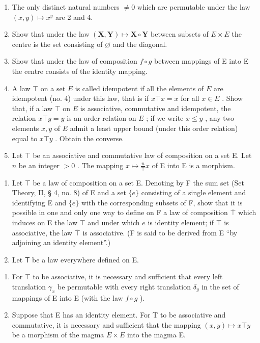 \begin{enumerate}
\item
  The only distinct natural numbers \(\neq 0\) which are permutable under the law \((x,y)\mapsto x^{y}\) are 2 and 4.
\item
  Show that under the law \((\mathbf{X}, \mathbf{Y}) \mapsto \mathbf{X} \circ \mathbf{Y}\) between subsets of \(E \times E\) the centre is the set consisting of \(\varnothing\) and the diagonal.
\item
  Show that under the law of composition \(f \circ g\) between mappings of E into E the centre consists of the identity mapping.
\item
  A law \(\top\) on a set \(E\) is called idempotent if all the elements of \(E\) are idempotent (no. 4) under this law, that is if \(x \top x = x\) for all \(x \in E\) . Show that, if a law \(\top\) on \(E\) is associative, commutative and idempotent, the relation \(x \top y = y\) is an order relation on \(E\) ; if we write \(x \leqslant y\) , any two elements \(x, y\) of \(E\) admit a least upper bound (under this order relation) equal to \(x \top y\) . Obtain the converse.
\item
  Let \(\top\) be an associative and commutative law of composition on a set E. Let \(n\) be an integer \(>0\) . The mapping \(x \mapsto \frac{n}{\top} x\) of E into E is a morphism.
\end{enumerate}

\BourbakiExercisesSection

\begin{enumerate}
\def\labelenumi{\arabic{enumi}.}
\item
  Let \(\top\) be a law of composition on a set E. Denoting by F the sum set (Set Theory, II, § 4, no. 8) of E and a set \(\{e\}\) consisting of a single element and identifying E and \(\{e\}\) with the corresponding subsets of F, show that it is possible in one and only one way to define on F a law of composition \(\overline{\top}\) which induces on E the law \(\top\) and under which \(e\) is identity element; if \(\top\) is associative, the law \(\overline{\top}\) is associative. (F is said to be derived from E ``by adjoining an identity element''.)
\item
  Let \(\mathsf{T}\) be a law everywhere defined on E.
\end{enumerate}

\begin{enumerate}
\def\labelenumi{(\alph{enumi})}
\item
  For \(\top\) to be associative, it is necessary and sufficient that every left translation \(\gamma_{x}\) be permutable with every right translation \(\delta_{y}\) in the set of mappings of E into E (with the law \(f \circ g\) ).
\item
  Suppose that E has an identity element. For T to be associative and commutative, it is necessary and sufficient that the mapping \((x,y)\mapsto x\top y\) be a morphism of the magma \(E\times E\) into the magma E.
\end{enumerate}

